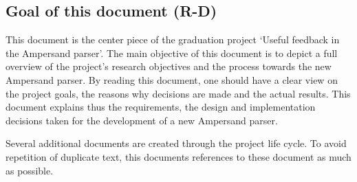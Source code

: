 
\subsection{Goal of this document (R-D)}
This document is the center piece of the graduation project `Useful feedback in the Ampersand parser'.
The main objective of this document is to depict a full overview of the project's research objectives and the process towards the new Ampersand parser.
By reading this document, one should have a clear view on the project goals, the reasons why decisions are made and the actual results.
This document explains thus the requirements, the design and implementation decisions taken for the development of a new Ampersand parser.

Several additional documents are created through the project life cycle.
To avoid repetition of duplicate text, this documents references to these document as much as possible.
